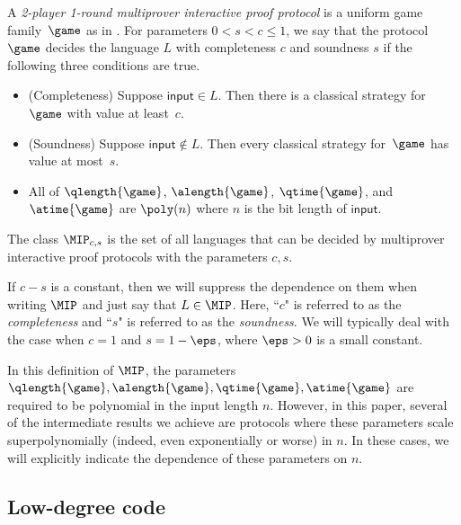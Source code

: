 \begin{definition}\label{def:mip-protocols}
A \emph{2-player 1-round multiprover interactive proof protocol} is a uniform
game family~$\game$ as in . For
parameters $0 < s < c \leq 1$, we say that
the protocol $\game$ decides the language $L$ with completeness
$c$ and soundness $s$ if the following three conditions are true.
\begin{itemize}
\item[$\circ$] (Completeness) Suppose $\mathsf{input} \in L$.  Then there is a classical strategy for~$\game$ with value at least~$c$.
\item[$\circ$] (Soundness) Suppose $\mathsf{input} \notin L$.  Then every classical strategy for~$\game$ has value at most~$s$.
\item[$\circ$] All of $\qlength{\game}$, $\alength{\game}$,
  $\qtime{\game}$, and $\atime{\game}$ are $\poly(n)$ where $n$ is
  the bit length of $\mathsf{input}$.
\end{itemize}
The class $\MIP_{c, s}$ is the set of all languages that can be
decided by multiprover interactive proof protocols with the parameters $c,s$.

If $c - s$ is a constant, then we will suppress the dependence on them when writing $\MIP$ and just say that $L \in \MIP$.
Here, ``$c$" is referred to as the \emph{completeness} and ``$s$" is referred to as the \emph{soundness}.
We will typically deal with the case when $c = 1$ and $s = 1-\eps$, where $\eps > 0$ is a small constant.

\end{definition}
In this definition of $\MIP$, the parameters $\qlength{\game}, \alength{\game},
\qtime{\game}, \atime{\game}$ are required to be polynomial in the
input length $n$. However, in this paper, several of the intermediate
results we achieve are protocols where these parameters scale
superpolynomially (indeed, even exponentially or worse) in $n$. In
these cases, we will explicitly indicate the dependence of these
parameters on $n$.


\subsection{Low-degree code}

